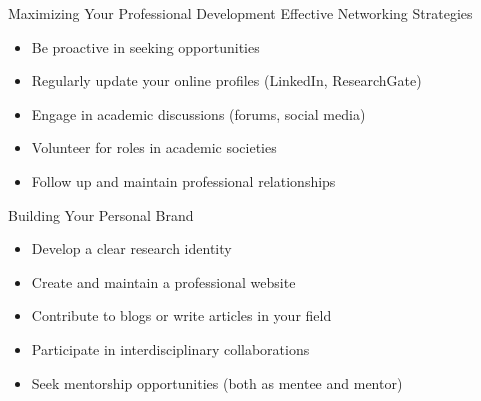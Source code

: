 \documentclass[10pt]{beamer}
\begin{document}
\begin{frame}[fragile]{Maximizing Your Professional Development}
\alert{Effective Networking Strategies}
\begin{itemize}
    \item Be proactive in seeking opportunities
    \item Regularly update your online profiles (LinkedIn, ResearchGate)
    \item Engage in academic discussions (forums, social media)
    \item Volunteer for roles in academic societies
    \item Follow up and maintain professional relationships
\end{itemize}

\vspace{0.3cm}
\alert{Building Your Personal Brand}
\begin{itemize}
    \item Develop a clear research identity
    \item Create and maintain a professional website
    \item Contribute to blogs or write articles in your field
    \item Participate in interdisciplinary collaborations
    \item Seek mentorship opportunities (both as mentee and mentor)
\end{itemize}

\end{frame}
\end{document}
